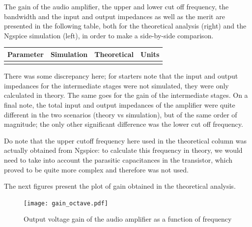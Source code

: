 The gain of the audio amplifier, the upper and lower cut off frequency, the bandwidth and the input and output impedances as well as the merit are presented in the following table, both for the theoretical analysis (right) and the Ngspice simulation (left), in order to make a side-by-side comparison.\par


\hfill
 \parbox{1\linewidth}{
  \centering
  \begin{tabular}{|l|l|l|r|}
    \hline    
    {\bf Parameter} & {\bf Simulation} & {\bf Theoretical } & {\bf Units }\\ \hline
    
  \label{tab:results}
  \end{tabular}
  }
  
  
There was some discrepancy here; for starters note that the input and output impedances for the intermediate stages were not simulated, they were only calculated in theory. The same goes for the gain of the intermediate stages. On a final note, the total input and output impedances of the amplifier were quite different in the two scenarios (theory vs simulation), but of the same order of magnitude; the only other significant difference was the lower cut off frequency.\par

Do note that the upper cutoff frequency here used in the theoretical column was actually obtained from Ngspice: to calculate this frequency in theory, we would need to take into account the parasitic capacitances in the transistor, which proved to be quite more complex and therefore was not used.


  The next figures present the plot of gain obtained in the theoretical analysis.


\begin{figure}[H] \centering
\texttt{[image: gain\_octave.pdf]}
\caption{Output voltage gain of the audio amplifier as a function of frequency}
\label{fig:gain_octa}
\end{figure}




\pagebreak



